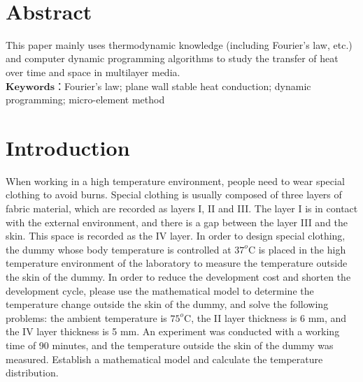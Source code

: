 \documentclass[12pt]{ctexart}
\makeatletter
\let\thedate\@date
\makeatother
\begin{document}
\begin{titlepage}
	{\large \thedate}\\[1.5 cm]
 
	\vfill
	
\end{titlepage}


\tableofcontents
\pagebreak


\section{Abstract}
This paper mainly uses thermodynamic knowledge (including Fourier's law, etc.) and computer dynamic programming algorithms to study the transfer of heat over time and space in multilayer media.\\
\indent $\textbf{Keywords}$：Fourier's law; plane wall stable heat conduction; dynamic programming; micro-element method
\section{Introduction}
\indent 
When working in a high temperature environment, people need to wear special clothing to avoid burns. Special clothing is usually composed of three layers of fabric material, which are recorded as layers I, II and III. The layer I is in contact with the external environment, and there is a gap between the layer III and the skin. This space is recorded as the IV layer. In order to design special clothing, the dummy whose body temperature is controlled at $37^{o}$C is placed in the high temperature environment of the laboratory to measure the temperature outside the skin of the dummy. In order to reduce the development cost and shorten the development cycle, please use the mathematical model to determine the temperature change outside the skin of the dummy,
and solve the following problems: the ambient temperature is $75^{o}$C, the II layer thickness is 6 mm, and the IV layer thickness is 5 mm. An experiment was conducted with a working time of 90 minutes, and the temperature outside the skin of the dummy was measured. Establish a mathematical model and calculate the temperature distribution.
\end{document}
